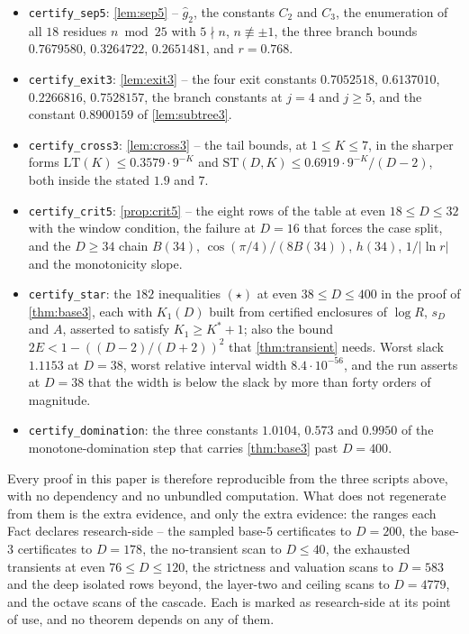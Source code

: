 \documentclass[11pt]{amsart}
\theoremstyle{definition}
\theoremstyle{remark}
\begin{document}
\begin{itemize}
\item \texttt{certify\_sep5}: \cref{lem:sep5} -- $\hat g_2$, the constants $C_2$ and $C_3$, the enumeration of all $18$ residues $n \bmod 25$ with $5 \nmid n$, $n \not\equiv \pm1$, the three branch bounds $0.7679580$, $0.3264722$, $0.2651481$, and $r = 0.768$.
\item \texttt{certify\_exit3}: \cref{lem:exit3} -- the four exit constants $0.7052518$, $0.6137010$, $0.2266816$, $0.7528157$, the branch constants at $j = 4$ and $j \ge 5$, and the constant $0.8900159$ of \cref{lem:subtree3}.
\item \texttt{certify\_cross3}: \cref{lem:cross3} -- the tail bounds, at $1 \le K \le 7$, in the sharper forms $\mathrm{LT}(K) \le 0.3579\cdot 9^{-K}$ and $\mathrm{ST}(D,K) \le 0.6919\cdot 9^{-K}/(D-2)$, both inside the stated $1.9$ and $7$.
\item \texttt{certify\_crit5}: \cref{prop:crit5} -- the eight rows of the table at even $18 \le D \le 32$ with the window condition, the failure at $D = 16$ that forces the case split, and the $D \ge 34$ chain $B(34)$, $\cos(\pi/4)/(8B(34))$, $h(34)$, $1/\lvert\ln r\rvert$ and the monotonicity slope.
\item \texttt{certify\_star}: the $182$ inequalities $(\star)$ at even $38 \le D \le 400$ in the proof of \cref{thm:base3}, each with $K_1(D)$ built from certified enclosures of $\log R$, $s_D$ and $A$, asserted to satisfy $K_1 \ge K^{*}+1$; also the bound $2E < 1 - ((D-2)/(D+2))^2$ that \cref{thm:transient} needs. Worst slack $1.1153$ at $D = 38$, worst relative interval width $8.4\cdot10^{-56}$, and the run asserts at $D = 38$ that the width is below the slack by more than forty orders of magnitude.
\item \texttt{certify\_domination}: the three constants $1.0104$, $0.573$ and $0.9950$ of the monotone-domination step that carries \cref{thm:base3} past $D = 400$.
\end{itemize}

Every proof in this paper is therefore reproducible from the three scripts above, with no dependency and no unbundled computation. What does not regenerate from them is the extra evidence, and only the extra evidence: the ranges each Fact declares research-side -- the sampled base-$5$ certificates to $D = 200$, the base-$3$ certificates to $D = 178$, the no-transient scan to $D \le 40$, the exhausted transients at even $76 \le D \le 120$, the strictness and valuation scans to $D = 583$ and the deep isolated rows beyond, the layer-two and ceiling scans to $D = 4779$, and the octave scans of the cascade. Each is marked as research-side at its point of use, and no theorem depends on any of them.
\end{document}
